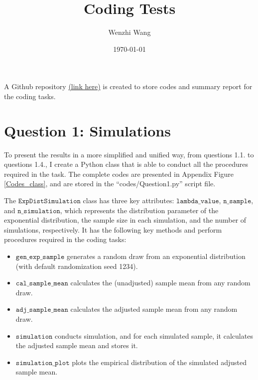 \documentclass[12pt]{article}
\theoremstyle{definition}
\begin{document}
 


\title{\bf Coding Tests} 
\author{Wenzhi Wang} 
\date{\today} 
\maketitle 

A Github repository \href{https://github.com/wenzhi-econ/CodingTests}{(link here)} is created to store codes and summary report for the coding tasks. 


\section{Question 1: Simulations}

To present the results in a more simplified and unified way, from questions 1.1. to questions 1.4., I create a Python class that is able to conduct all the procedures required in the task. The complete codes are presented in Appendix Figure \ref{Codes_class}, and are stored in the ``codes/Question1.py'' script file.

The $\mathtt{ExpDistSimulation}$ class has three key attributes: $\mathtt{lambda\_value}$, $\mathtt{n\_sample}$, and $\mathtt{n\_simulation}$, which represents the distribution parameter of the exponential distribution, the sample size in each simulation, and the number of simulations, respectively. It has the following key methods and perform procedures required in the coding tasks:
\begin{itemize}[topsep=0pt, leftmargin=20pt, itemsep=0pt]
\setlength{\parskip}{10pt} 
\item $\mathtt{gen\_exp\_sample}$ generates a random draw from an exponential distribution (with default randomization seed 1234).
\item $\mathtt{cal\_sample\_mean}$ calculates the (unadjusted) sample mean from any random draw.
\item $\mathtt{adj\_sample\_mean}$ calculates the adjusted sample mean from any random draw.
\item $\mathtt{simulation}$ conducts simulation, and for each simulated sample, it calculates the adjusted sample mean and stores it.
\item $\mathtt{simulation\_plot}$ plots the empirical distribution of the simulated adjusted sample mean.
\end{itemize}
\end{document}
